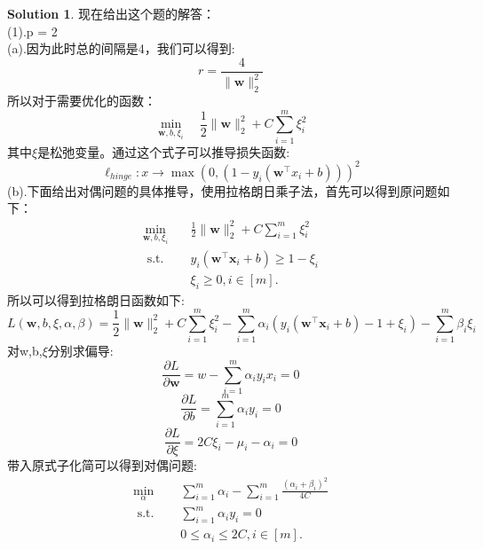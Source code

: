 \documentclass[a4paper,UTF8]{article}
\numberwithin{equation}{section}
\theoremstyle{definition}
\newtheorem*{solution}{Solution}
\newcommand{\vct}[1]{\boldsymbol{#1}} %
\newcommand{\vw}{\vct{w}}
\newcommand{\vx}{\vct{x}}
\begin{document}
\begin{solution}
现在给出这个题的解答：\\
(1).p = 2\\
(a).因为此时总的间隔是4，我们可以得到:\\
\[  r = \frac{4}{\|\vw\|_{2}^{2}}  \]
所以对于需要优化的函数：\\
\[  \min _{\vw, b, \xi_{i}} \quad  \frac{1}{2}\|\vw\|_{2}^{2}+C \sum_{i=1}^{m} \xi^2_{i}\]
其中$\xi$是松弛变量。通过这个式子可以推导损失函数:
\[  \ell_{hinge} :x \to \max(0, (1 - y_i (\vw^{\top}x_i + b)))^2\]
(b).下面给出对偶问题的具体推导，使用拉格朗日乘子法，首先可以得到原问题如下：\\
\begin{equation}
    \begin{aligned}
        \min _{\vw, b, \xi_{i}} \quad & \frac{1}{2}\|\vw\|_{2}^{2}+C \sum_{i=1}^{m} \xi^2_{i} \\
        \text { s.t. } \quad & y_{i}\left(\vw^{\top} \vx_{i}+b\right) \geq 1- \xi_{i} \\
        & \xi_{i} \geq 0, i \in [m] .
    \end{aligned}
\end{equation}
所以可以得到拉格朗日函数如下:\\
\[  L(\vw, b, \xi, \alpha, \beta) = \frac{1}{2}\|\vw\|_{2}^{2} + C \sum_{i=1}^{m} \xi^2_{i} - \sum_{i=1}^{m} \alpha_i( y_{i}(\vw^{\top} \vx_{i}+b) - 1 + \xi_{i}) - \sum_{i=1}^{m} \beta_i \xi_{i}    \]
对w,b,$\xi$分别求偏导:\\
\[  \frac{\partial L}{\partial \vw} = w  - \sum_{i=1}^{m}\alpha_i y_i x_i = 0\]
\[  \frac{\partial L}{\partial b} =  \sum_{i=1}^{m}\alpha_i y_i  = 0\]
\[  \frac{\partial L}{\partial \xi} = 2C\xi_i - \mu_i - \alpha_i = 0\]
带入原式子化简可以得到对偶问题:\\
\begin{equation}
    \begin{aligned}
        \min _{\alpha} \quad & \sum_{i=1}^{m}\alpha_i - \sum_{i=1}^{m}\frac{(\alpha_i + \beta_i)^2}{4C}\\
        \text { s.t. } \quad &  \sum_{i=1}^{m}\alpha_i y_i  = 0\\
        & 0 \leq \alpha_i \leq 2C, i \in [m] .
    \end{aligned}
\end{equation}


\end{solution}
\end{document}
